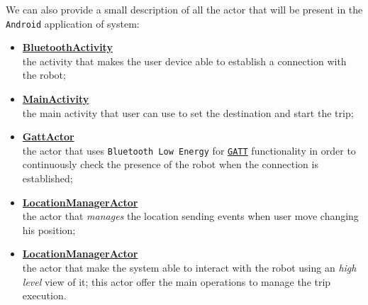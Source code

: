 We can also provide a small description of all the actor that will be present in the \texttt{Android} application of \gitberto system:
\begin{itemize}
	\item \underline{\textbf{BluetoothActivity}}\\
	the activity that makes the user device able to establish a connection with the robot;
	
	 \item \underline{\textbf{MainActivity}}\\
	 the main activity that user can use to set the destination and start the trip;
	 
	 \item \underline{\textbf{GattActor}}\\
	 the actor that uses \texttt{Bluetooth Low Energy} for \href{https://en.wikipedia.org/wiki/Bluetooth_Low_Energy#GATT_operations}{\texttt{GATT}} functionality in order to continuously check the presence of the robot when the connection is established;
	 
	 \item \underline{\textbf{LocationManagerActor}}\\
	 the actor that \textit{manages} the location sending events when user move changing his position;
	 
	 \item \underline{\textbf{LocationManagerActor}}\\
	 the actor that make the system able to interact with the robot using an \textit{high level} view of it; this actor offer the main operations to manage the trip execution.
\end{itemize}
